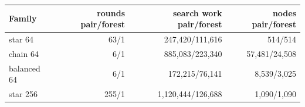 \begin{center}\small
\begin{tabular}{@{}lrrr@{}}
\toprule
Family & rounds pair/forest & search work pair/forest & nodes pair/forest \\
\midrule
star 64 & 63/1 & 247,420/111,616 & 514/514 \\
chain 64 & 6/1 & 885,083/223,340 & 57,481/24,508 \\
balanced 64 & 6/1 & 172,215/76,141 & 8,539/3,025 \\
star 256 & 255/1 & 1,120,444/126,688 & 1,090/1,090 \\
\bottomrule
\end{tabular}
\end{center}

